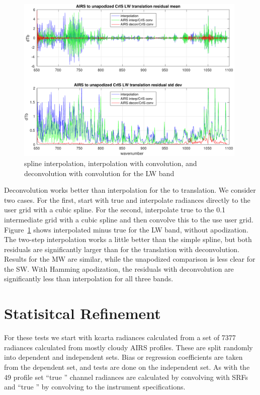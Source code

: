 \documentclass[12pt]{article}
\begin{document}
\begin{figure} %
  \centering
  \includegraphics[height=8cm]{figures/a2cris_interp_LW.pdf}
  \caption{spline interpolation, interpolation with convolution, 
    and deconvolution with convolution for the {\cris} LW band}
  \label{intpLW}
\end{figure}

Deconvolution works better than interpolation for the {\airs} to
{\cris} translation.  We consider two cases.  For the first, start
with true {\airs} and interpolate radiances directly to the {\cris}
user grid with a cubic spline.  For the second, interpolate true
{\airs} to the 0.1 {\wn} intermediate grid with a cubic spline and
then convolve this to the use {\cris} user grid.  Figure~\ref{intpLW}
shows interpolated {\cris} minus true {\cris} for the LW band,
without apodization.  The two-step interpolation works a little
better than the simple spline, but both residuals are significantly
larger than for the translation with deconvolution.  Results for the
MW are similar, while the unapodized comparison is less clear for the
SW.  With Hamming apodization, the residuals with deconvolution are
significantly less than interpolation for all three bands.

\FloatBarrier
\section{Statisitcal Refinement}
\label{statfix}

For these tests we start with kcarta radiances calculated from a 
set of 7377 radiances calculated from mostly cloudy AIRS profiles.
These are split randomly into dependent and independent sets.  
Bias or regression coefficients are taken from the dependent set,
and tests are done on the independent set.  As with the 49 profile
set ``true {\airs}'' channel radiances are calculated by convolving
with {\airs} SRFs and ``true {\cris}'' by convolving to the {\cris}
instrument specifications.
\end{document}
